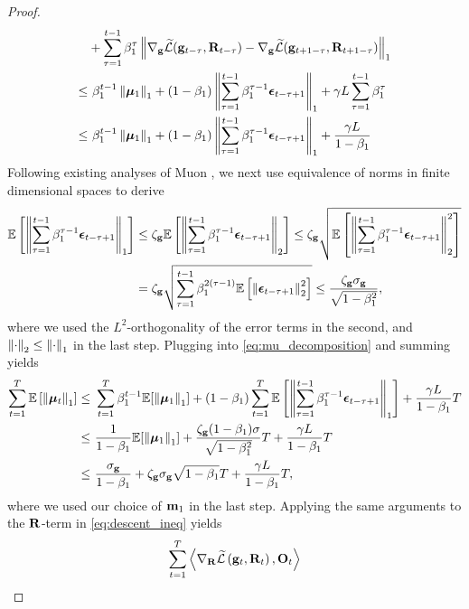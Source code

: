 {\begin{proof}
\begin{align}
\begin{split}
    &+ \sum_{\tau=1}^{t-1} \beta_1^{\tau} \left \| \nabla_{\mathbf{g}} \widetilde {\mathcal{L}}(\mathbf{g}_{t - \tau}, \mathbf{R}_{t-\tau}) - \nabla_{\mathbf{g}} \widetilde {\mathcal{L}}(\mathbf{g}_{t + 1 - \tau}, \mathbf{R}_{t + 1 - \tau}) \right\|_1\\
    \leq &\ \beta_1^{t-1} \left \| \boldsymbol{\mu}_1 \right\|_1 
    + (1-\beta_1) \left \| \sum_{\tau=1}^{t-1} \beta_1^{\tau - 1} \bm{\epsilon}_{t- \tau + 1} \right\|_1 
    + \gamma L \sum_{\tau=1}^{t-1} \beta_1^{\tau} \\
    \leq &\ \beta_1^{t-1} \left \| \boldsymbol{\mu}_1 \right\|_1 
    + (1-\beta_1) \left \| \sum_{\tau=1}^{t-1} \beta_1^{\tau - 1} \bm{\epsilon}_{t- \tau + 1} \right\|_1 
    + \frac{\gamma L}{1-\beta_1}
\end{split}\end{align}
Following existing analyses of Muon \citep{ConvergenceAnalysisMuon2025shen}, we next use equivalence of norms in finite dimensional spaces to derive
\begin{align*}
    \mathbb{E}\left[\left \| \sum_{\tau=1}^{t-1} \beta_1^{\tau - 1} \bm{\epsilon}_{t- \tau + 1} \right\|_1\right]
    &\leq \zeta_{\mathbf{g}} \mathbb{E}\left[\left \| \sum_{\tau=1}^{t-1} \beta_1^{\tau - 1} \bm{\epsilon}_{t- \tau + 1} \right\|_2\right]
    \leq \zeta_{\mathbf{g}} \sqrt{\mathbb{E}\left[\left \| \sum_{\tau=1}^{t-1} \beta_1^{\tau - 1} \bm{\epsilon}_{t- \tau + 1} \right\|_2^2\right]}\\
    &= \zeta_{\mathbf{g}} \sqrt{\sum_{\tau=1}^{t-1} \beta_1^{2(\tau-1)} \mathbb{E}\left[\left \| \bm{\epsilon}_{t- \tau + 1} \right\|_2^2\right]} 
    \leq \frac{\zeta_{\mathbf{g}} \sigma_{\mathbf{g}}}{\sqrt{1-\beta_1^2}},
\end{align*}
where we used the $L^2$-orthogonality of the error terms in the second, and $\left \| \cdot \right\|_2 \leq \left \| \cdot \right\|_1$ in the last step. Plugging into \eqref{eq:mu_decomposition} and summing yields
\begin{align*}
    \sum_{t=1}^T \E\left[\norm{\mubf_t}_1\right] \leq
    &\ \sum_{t=1}^T \beta_1^{t-1} \E [\norm{\mubf_1}_1] 
    + (1-\beta_1)\sum_{t=1}^T \E\left[\norm{\sum_{\tau=1}^{t-1} \beta_1^{\tau - 1} \eps_{t- \tau + 1}}_1\right] 
    + \frac{\gamma L}{1-\beta_1}T\\
    \leq &\ 
    \frac{1}{1-\beta_1} \E [\norm{\mubf_1}_1] 
    + \frac{\zeta_\g (1-\beta_1) \sigma}{\sqrt{1-\beta_1^2}}T
    + \frac{\gamma L}{1-\beta_1}T\\
    \leq &\ 
    \frac\sigg{1-\beta_1}
    + \zeta_\g \sigg \sqrt{1-\beta_1} T
    + \frac{\gamma L}{1-\beta_1}T,
\end{align*}
where we used our choice of $\mathbf{m}_1$ in the last step. Applying the same arguments to the $\mathbf{R}$-term in \eqref{eq:descent_ineq} yields
\begin{align*}
    \sum_{t=1}^T \left\langle \nabla_\Rbf \Ft\pare{\gt,\Rt}, \Ot\right\rangle

\end{align*}
\end{proof}}
